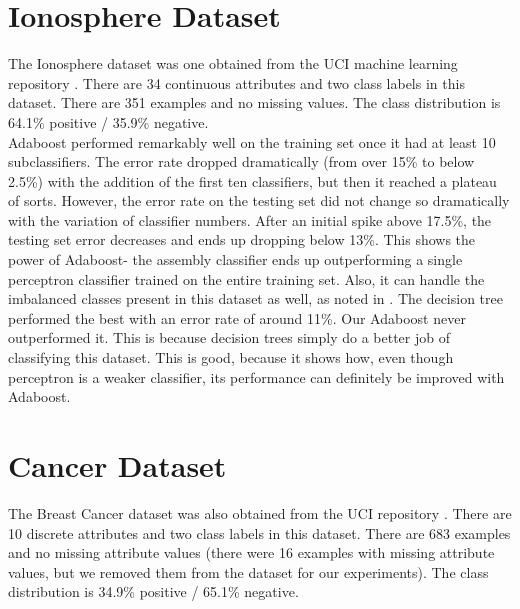 \documentclass{article}
\begin{document}
\section{Ionosphere Dataset}

The Ionosphere dataset was one obtained from the UCI machine learning repository \cite{ionosphere}. There are 34 continuous attributes and two class labels in this dataset. There are 351 examples and no missing values. The class distribution is 64.1\% positive / 35.9\% negative. \\

Adaboost performed remarkably well on the training set once it had at least 10 subclassifiers. The error rate dropped dramatically (from over 15\% to below 2.5\%) with the addition of the first ten classifiers, but then it reached a plateau of sorts. However, the error rate on the testing set did not change so dramatically with the variation of classifier numbers. After an initial spike above 17.5\%, the testing set error decreases and ends up dropping below 13\%. This shows the power of Adaboost- the assembly classifier ends up outperforming a single perceptron classifier trained on the entire training set. Also, it can handle the imbalanced classes present in this dataset as well, as noted in \cite{sun-kamel-wang}. The decision tree performed the best with an error rate of around 11\%. Our Adaboost never outperformed it. This is because decision trees simply do a better job of classifying this dataset. This is good, because it shows how, even though perceptron is a weaker classifier, its performance can definitely be improved with Adaboost.

\section{Cancer Dataset}

The Breast Cancer dataset was also obtained from the UCI repository \cite{cancer}. There are 10 discrete attributes and two class labels in this dataset. There are 683 examples and no missing attribute values (there were 16 examples with missing attribute values, but we removed them from the dataset for our experiments). The class distribution is 34.9\% positive / 65.1\% negative. \\
\end{document}
